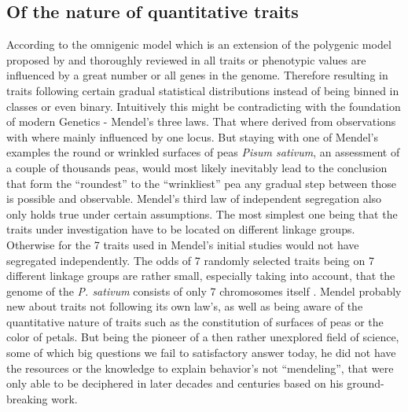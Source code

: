 \subsection{Of the nature of quantitative traits}
According to the omnigenic model which is an extension of the polygenic model proposed by \cite{boyle2017expanded} and
thoroughly reviewed in \cite{timpson2018} all traits or phenotypic values are influenced
by a great number or all genes in the genome. Therefore resulting in traits following certain gradual statistical distributions
instead of being binned in classes or even binary. Intuitively this might be contradicting with the foundation of modern Genetics -
Mendel's three laws. That where derived from observations with where mainly influenced by one locus. But staying with one of
Mendel's examples the round or wrinkled surfaces of  peas \textit{Pisum sativum}, an assessment of a couple of thousands peas, would
most likely inevitably
lead to the conclusion that form the ``roundest'' to the ``wrinkliest'' pea any gradual step between those is possible and observable.
Mendel's third law of independent segregation also only holds true under certain assumptions. The most simplest one being that the traits
under investigation have to be located on different linkage groups. Otherwise for the 7 traits used in Mendel's initial studies would not have
segregated independently. The odds of 7 randomly selected traits being on 7 different linkage groups are rather small, especially taking
into account, that the genome of the \textit{P. sativum} consists of only 7 chromosomes itself \cite{kalo2004}. Mendel probably new about
traits not following its own law's,
as well as being aware of the quantitative nature of traits such as the constitution of surfaces of peas or the color of petals. But being the
pioneer of a then rather unexplored field of science, some of which big questions we fail to satisfactory answer today, he did not have the
resources or the knowledge to explain behavior's not ``mendeling'', that were only able to be deciphered in later decades and centuries
based on his ground-breaking work. 



